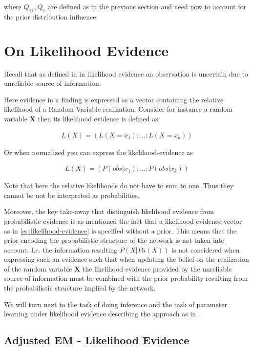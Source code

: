 \documentclass[11pt]{article}
\begin{document}
\begin{article}
where \(Q_{11}, Q_1\) are defined as in the previous section and
need now to account for the prior distribution influence.


\section{On Likelihood Evidence}
\label{sec:org7d87408}

Recall that as defined in \cite{Mrad_2015} in likelihood evidence an
observation is uncertain due to unreliable source of information.

Here evidence in a finding is expressed as a vector containing the
relative likelihood of a Random Variable realization. Consider for
instance a random variable \textbf{X} then its likelihood evidence is
defined as:

\begin{align} \label{eq:likelihood-evidence}
 L(X) = (L(X = x_1): ... : L(X = x_k))
\end{align}

Or when normalized you can express the likelihood-evidence as 

\begin{align} \label{eq:normalized-likelihood-evidence}
 L(X) = (P(obs | x_1): ... : P(obs | x_k))
\end{align}

Note that here the relative likelihoods do not have to sum to
one. Thus they cannot be not be interpreted as probabilities.

Moreover, the key take-away that distinguish likelihood evidence
from probabilistic evidence is as mentioned the fact that a
likelihood evidence vector as in \ref{eq:likelihood-evidence} is
specified without a prior. This means that the prior encoding the
probabilistic structure of the network is not taken into
account. I.e. the information resulting \(P(X|Pa(X))\) is not
considered when expressing such an evidence such that when
updating the belief on the realization of the random variable \textbf{X}
the likelihood evidence provided by the unreliable source of
information must be combined with the prior probability resulting
from the probabilistic structure implied by the network.

We will turn next to the task of doing inference and the task of
parameter learning under likelihood evidence describing the
approach as in \cite{Wasserkrug_all}.

\subsection{Adjusted EM - Likelihood Evidence}
\label{sec:orgd64fa29}


\end{article}
\end{document}
